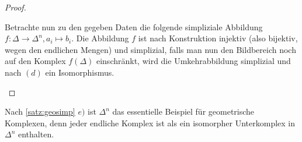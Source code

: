 \begin{Satz}
\begin{proof}
\begin{enumerate}[(a)]
            Betrachte nun zu den gegeben Daten die folgende
            simpliziale Abbildung
            $f : \Delta \rightarrow \Delta^n , a_i \mapsto b_i$.  Die
            Abbildung $f$ ist nach Konstruktion injektiv (also
            bijektiv, wegen den endlichen Mengen) und simplizial,
            falls man nun den Bildbereich noch auf den Komplex
            $f(\Delta)$ einschränkt, wird die Umkehrabbildung
            simplizial und nach $(d)$ ein Isomorphismus.
          \end{enumerate}
	\end{proof}
\end{Satz}

\begin{Bem}
  Nach \cref{satz:geosimp} $e)$ ist $\Delta^n$ das essentielle
  Beispiel für geometrische Komplexen, denn jeder endliche Komplex ist
  als ein isomorpher Unterkomplex in $\Delta^n$ enthalten.
\end{Bem}














